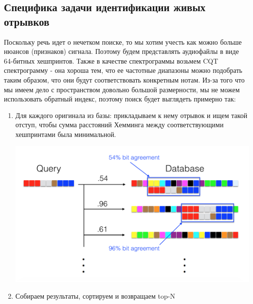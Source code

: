 \subsection{Специфика задачи идентификации живых отрывков}
Поскольку речь идет о нечетком поиске, то мы хотим учесть как можно
больше нюансов (признаков) сигнала. Поэтому будем представлять аудиофайлы в виде
64-битных хешпринтов. Также в качестве спектрограммы возьмем CQT спектрограмму -
она хороша тем, что ее частотные диапазоны можно подобрать таким образом, что они будут
соответствовать конкретным нотам.
Из-за того что мы имеем дело с пространством довольно большой размерности, мы не можем
использовать обратный индекс, поэтому поиск будет выглядеть примерно так:
\begin{enumerate}[label=\arabic*.]
    \item Для каждого оригинала из базы: прикладываем к нему отрывок и ищем такой отступ, чтобы сумма расстояний
    Хемминга между соответствующими хешпринтами была минимальной.
    \begin{center}
        \includegraphics[scale=0.5]{inc/img/query.png}
    \end{center}
    \item Собираем результаты, сортируем и возвращаем top-N
\end{enumerate}
